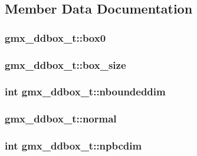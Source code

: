 \subsection{\-Member \-Data \-Documentation}
\hypertarget{structgmx__ddbox__t_a0817b838d4ddf9ac2abf3e4b3b11f7bc}{
\subsubsection[{box0}]{ {\bf gmx\-\_\-ddbox\-\_\-t\-::box0}}}\label{structgmx__ddbox__t_a0817b838d4ddf9ac2abf3e4b3b11f7bc}
\hypertarget{structgmx__ddbox__t_a00ddbac275a7b5d79b3d1b98de42ad76}{
\subsubsection[{box\-\_\-size}]{ {\bf gmx\-\_\-ddbox\-\_\-t\-::box\-\_\-size}}}\label{structgmx__ddbox__t_a00ddbac275a7b5d79b3d1b98de42ad76}
\hypertarget{structgmx__ddbox__t_abdb8863bdc4a0ede8af5a610df6d6657}{
\subsubsection[{nboundeddim}]{\setlength{\rightskip}{0pt plus 5cm}int {\bf gmx\-\_\-ddbox\-\_\-t\-::nboundeddim}}}\label{structgmx__ddbox__t_abdb8863bdc4a0ede8af5a610df6d6657}
\hypertarget{structgmx__ddbox__t_add0e9153aab56500db4bbcddb4478cb8}{
\subsubsection[{normal}]{ {\bf gmx\-\_\-ddbox\-\_\-t\-::normal}}}\label{structgmx__ddbox__t_add0e9153aab56500db4bbcddb4478cb8}
\hypertarget{structgmx__ddbox__t_a59ca78e17b4de75f33d0e7298cf2ab80}{
\subsubsection[{npbcdim}]{\setlength{\rightskip}{0pt plus 5cm}int {\bf gmx\-\_\-ddbox\-\_\-t\-::npbcdim}}}\label{structgmx__ddbox__t_a59ca78e17b4de75f33d0e7298cf2ab80}
